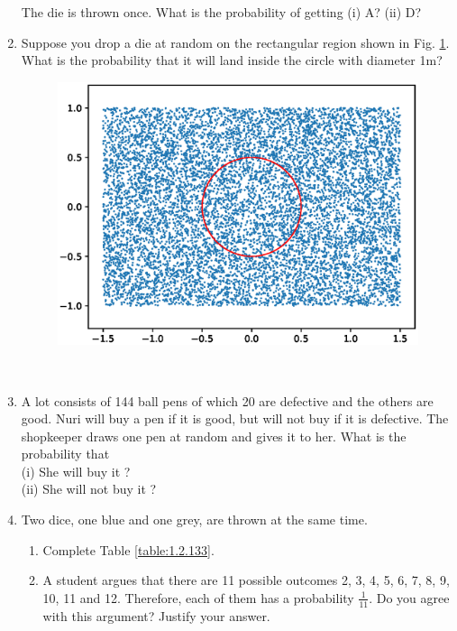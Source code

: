 \begin{enumerate}[label=\arabic*.,ref=\thesubsection.\theenumi]
The die is thrown once. What is the probability of getting (i) A? (ii) D?
\\
\solution

\item Suppose you drop a die at random on the rectangular region shown in Fig. \ref{fig:1.2.131}. What is the probability that it will land inside the circle with diameter 1m?
\begin{figure}[!ht]
\centering
\includegraphics[width=\columnwidth]{./prob/figs/rectangle.eps}
\caption{}
\label{fig:1.2.131}
\end{figure}
\\
\solution

\item A lot consists of 144 ball pens of which 20 are defective and the others are good. Nuri will buy a pen if it is good, but will not buy if it is defective. The shopkeeper draws one pen at random and gives it to her. What is the probability that\\
(i) She will buy it ?\\
(ii) She will not buy it ?
\\
\solution

\item Two dice, one blue and one grey, are thrown at the same time.  
\begin{enumerate}
\item  Complete Table \ref{table:1.2.133}.
\item  A student argues that there are 11 possible outcomes 2, 3, 4, 5, 6, 7, 8, 9, 10, 11 and 12. Therefore, each of them has a probability $\frac{1}{11}$. Do you agree with this argument? Justify your answer.

\end{enumerate}
\end{enumerate}
